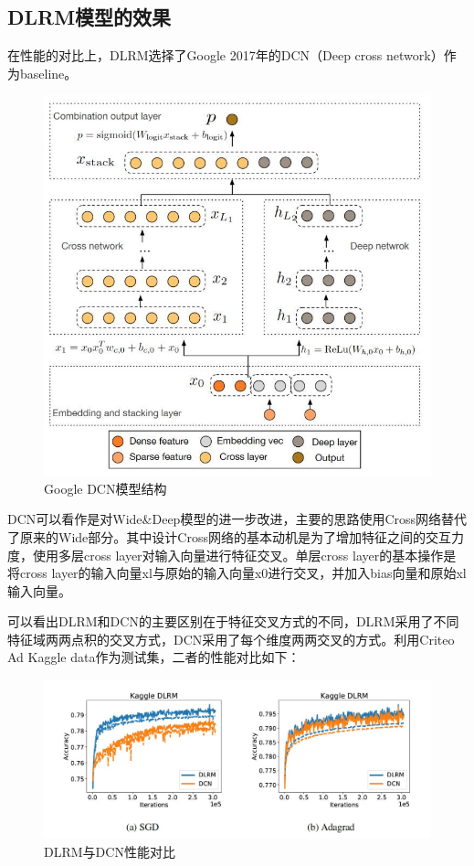 \documentclass[12pt]{article}
\begin{document}
\subsection{DLRM模型的效果}
在性能的对比上，DLRM选择了Google 2017年的DCN（Deep cross network）作为baseline。
\begin{figure}[H]
    \centering
    \includegraphics[width=1\textwidth]{fig/Facebook_Google_DCN_Structure.jpg}
    \caption{Google DCN模型结构}
\end{figure}

DCN可以看作是对Wide\&Deep模型的进一步改进，主要的思路使用Cross网络替代了原来的Wide部分。其中设计Cross网络的基本动机是为了增加特征之间的交互力度，使用多层cross layer对输入向量进行特征交叉。单层cross layer的基本操作是将cross layer的输入向量xl与原始的输入向量x0进行交叉，并加入bias向量和原始xl输入向量。

可以看出DLRM和DCN的主要区别在于特征交叉方式的不同，DLRM采用了不同特征域两两点积的交叉方式，DCN采用了每个维度两两交叉的方式。利用Criteo Ad Kaggle data作为测试集，二者的性能对比如下：
\begin{figure}[H]
    \centering
    \includegraphics[width=1\textwidth]{fig/Facebook_DLRM_DCN_Compare.jpg}
    \caption{DLRM与DCN性能对比}
\end{figure}
\end{document}
